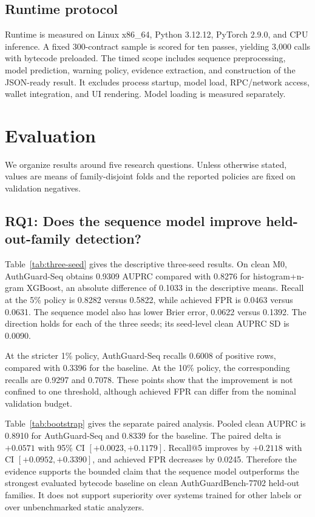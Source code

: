 \documentclass[conference]{IEEEtran}
\newcommand{\model}{AuthGuard-Seq}
\newcommand{\bench}{AuthGuardBench-7702}
\begin{document}
\subsection{Runtime protocol}

Runtime is measured on Linux x86\_64, Python 3.12.12, PyTorch 2.9.0, and CPU inference. A fixed
300-contract sample is scored for ten passes, yielding 3,000 calls with bytecode preloaded. The
timed scope includes sequence preprocessing, model prediction, warning policy, evidence
extraction, and construction of the JSON-ready result. It excludes process startup, model load,
RPC/network access, wallet integration, and UI rendering. Model loading is measured separately.

\section{Evaluation}
\label{sec:evaluation}

We organize results around five research questions. Unless otherwise stated, values are means of
family-disjoint folds and the reported policies are fixed on validation negatives.

\subsection{RQ1: Does the sequence model improve held-out-family detection?}

Table~\ref{tab:three-seed} gives the descriptive three-seed results. On clean M0, \model{} obtains
0.9309 AUPRC compared with 0.8276 for histogram+n-gram XGBoost, an absolute difference of 0.1033
in the descriptive means. Recall at the 5\% policy is 0.8282 versus 0.5822, while achieved FPR is
0.0463 versus 0.0631. The sequence model also has lower Brier error, 0.0622 versus 0.1392. The
direction holds for each of the three seeds; its seed-level clean AUPRC SD is 0.0090.

At the stricter 1\% policy, \model{} recalls 0.6008 of positive rows, compared with 0.3396 for the
baseline. At the 10\% policy, the corresponding recalls are 0.9297 and 0.7078. These points show
that the improvement is not confined to one threshold, although achieved FPR can differ from the
nominal validation budget.



Table~\ref{tab:bootstrap} gives the separate paired analysis. Pooled clean AUPRC is 0.8910 for
\model{} and 0.8339 for the baseline. The paired delta is $+0.0571$ with 95\% CI
$[+0.0023,+0.1179]$. Recall@5 improves by $+0.2118$ with CI
$[+0.0952,+0.3390]$, and achieved FPR decreases by 0.0245. Therefore the evidence supports the
bounded claim that the sequence model outperforms the strongest evaluated bytecode baseline on
clean \bench{} held-out families. It does not support superiority over systems trained for other
labels or over unbenchmarked static analyzers.
\end{document}
